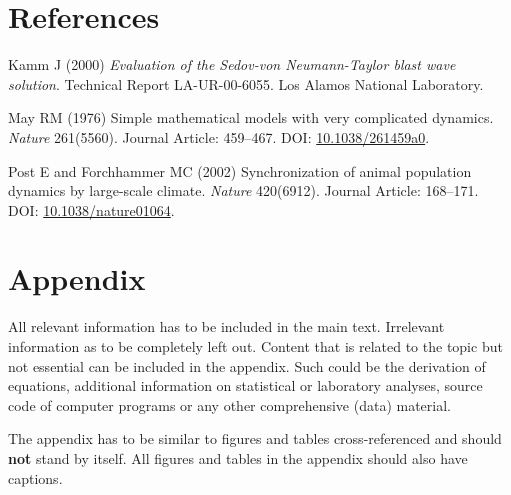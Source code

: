 \documentclass[a4paper,12pt]{article}
\begin{document}
\hypertarget{references}{%
\section*{References}\label{references}}

\noindent

\setlength{\parindent}{-0.5cm}
\setlength{\leftskip}{0.5cm}
\setlength{\parskip}{8pt}

\hypertarget{refs}{}
\leavevmode\hypertarget{ref-kamm2000}{}%
Kamm J (2000) \emph{Evaluation of the Sedov-von Neumann-Taylor blast wave solution}. Technical Report LA-UR-00-6055. Los Alamos National Laboratory.

\leavevmode\hypertarget{ref-May1976}{}%
May RM (1976) Simple mathematical models with very complicated dynamics. \emph{Nature} 261(5560). Journal Article: 459--467. DOI: \href{https://doi.org/10.1038/261459a0}{10.1038/261459a0}.

\leavevmode\hypertarget{ref-RN410}{}%
Post E and Forchhammer MC (2002) Synchronization of animal population dynamics by large-scale climate. \emph{Nature} 420(6912). Journal Article: 168--171. DOI: \href{https://doi.org/10.1038/nature01064}{10.1038/nature01064}.

\indent
\setlength{\parindent}{17pt}
\setlength{\leftskip}{0pt}
\setlength{\parskip}{0pt}

\newpage

\appendix

\hypertarget{appendix}{%
\section{Appendix}\label{appendix}}

All relevant information has to be included in the main text. Irrelevant information as to be completely left out. Content that is related to the topic but not essential can be included in the appendix. Such could be the derivation of equations, additional information on statistical or laboratory analyses, source code of computer programs or any other comprehensive (data) material.

The appendix has to be similar to figures and tables cross-referenced and should \textbf{not} stand by itself. All figures and tables in the appendix should also have captions.
\end{document}
